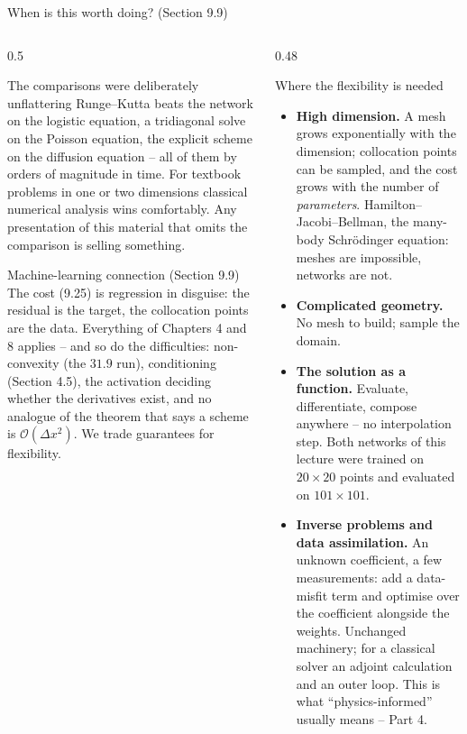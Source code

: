 \documentclass[10pt,aspectratio=169]{beamer}
\begin{document}
\begin{frame}{When is this worth doing? (Section 9.9)}
\small
\begin{columns}[T]
\begin{column}{0.5\textwidth}
\begin{block}{The comparisons were deliberately unflattering}
\scriptsize
Runge--Kutta beats the network on the logistic equation, a tridiagonal
solve on the Poisson equation, the explicit scheme on the diffusion
equation -- all of them by orders of magnitude in time.  For textbook
problems in one or two dimensions classical numerical analysis wins
comfortably.  Any presentation of this material that omits the comparison
is selling something.
\end{block}
\begin{block}{Machine-learning connection (Section 9.9)}
\scriptsize
The cost (9.25) is regression in disguise: the residual is the target, the
collocation points are the data.  Everything of Chapters 4 and 8 applies --
and so do the difficulties: non-convexity (the $31.9$ run), conditioning
(Section 4.5), the activation deciding whether the derivatives exist, and no
analogue of the theorem that says a scheme is $\mathcal{O}(\Delta x^{2})$.
We trade guarantees for flexibility.
\end{block}
\end{column}
\begin{column}{0.48\textwidth}
\begin{block}{Where the flexibility is needed}
\scriptsize
\begin{itemize}
  \item \textbf{High dimension.}  A mesh grows exponentially with the
        dimension; collocation points can be sampled, and the cost grows with
        the number of \emph{parameters}.  Hamilton--Jacobi--Bellman, the
        many-body Schr\"odinger equation: meshes are impossible, networks
        are not.
  \item \textbf{Complicated geometry.}  No mesh to build; sample the domain.
  \item \textbf{The solution as a function.}  Evaluate, differentiate,
        compose anywhere -- no interpolation step.  Both networks of this
        lecture were trained on $20\times20$ points and evaluated on
        $101\times101$.
  \item \textbf{Inverse problems and data assimilation.}  An unknown
        coefficient, a few measurements: add a data-misfit term and optimise
        over the coefficient alongside the weights.  Unchanged machinery; for
        a classical solver an adjoint calculation and an outer loop.  This is
        what ``physics-informed'' usually means -- Part 4.
\end{itemize}
\end{block}
\end{column}
\end{columns}
\end{frame}
\end{document}
